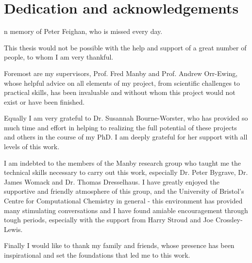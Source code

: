 %
%

\chapter*{Dedication and acknowledgements}
\begin{SingleSpace}
n memory of Peter Feighan, who is missed every day.

\hfill \break
\hfill \break
\hfill \break

This thesis would not be possible with the help and support of a great number of
people, to whom I am very thankful.

\hfill \break

Foremost are my supervisors, Prof. Fred Manby and Prof. Andrew Orr-Ewing, whose
helpful advice on all elements of my project, from scientific challenges to practical
skills, has been invaluable and without whom this project would not exist or have 
been finished.

\hfill \break

Equally I am very grateful to Dr. Susannah Bourne-Worster, who has provided so
much time and effort in helping to realizing the full potential of these projects
and others in the course of my PhD. I am deeply grateful for her support with all 
levels of this work.

\hfill \break

I am indebted to the members of the Manby research group who taught me the technical
skills necessary to carry out this work, especially Dr. Peter Bygrave, Dr. James
Womack and Dr. Thomas Dresselhaus. I have greatly enjoyed the supportive and friendly
atmosphere of this group, and the University of Bristol's Centre for Computational 
Chemistry in general - this environment has provided many stimulating conversations 
and I have found amiable encouragement through tough periods, especially with the 
support from Harry Stroud and Joe Crossley-Lewis.

\hfill \break

Finally I would like to thank my family and friends, whose presence has been inspirational
and set the foundations that led me to this work.

\end{SingleSpace}
\clearpage